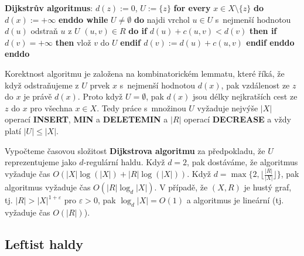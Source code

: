 \documentclass[a4paper,12pt]{article}
\newcommand{\algoritmus}[1]{
  {
  \setlength\fboxrule{0.5pt}

  \begin{boxedminipage}{0.8\textwidth}

 #1
  \end{boxedminipage}

  }
  }
\begin{document}
\algoritmus{{\bf Dijkstrův algoritmus}:\newline 
$d(z):=0$, $U:=\{z\}$\newline 
{\bf \textsf{for every}} $x\in X\setminus \{z\}$ {\bf \textsf{do}} $d(x):=+\infty$ {\bf \textsf{enddo}\newline 
\textsf{while}} $U\ne\emptyset$ {\bf \textsf{do}\newline 
\phantom{{\rm ---}}}najdi vrchol $u\in U$ s~nejmenší hodnotou $
d(u)$\newline 
\phantom{---}odstraň $u$ z $U$\newline 
\phantom{---}{\bf \textsf{for every}} $(u,v)\in R$ {\bf \textsf{do} \newline 
\phantom{{\rm ------}}\textsf{if}} $d(u)+c(u,v)<d(v)$ {\bf \textsf{then}\newline 
\phantom{{\rm ---------}}\textsf{if}} $d(v)=+\infty$ {\bf \textsf{then}} vlož $v$ \textsf{do} $
U$ {\bf \textsf{endif}\newline 
\phantom{{\rm ---------}}$d(v):=d(u)+c(u,v)$\newline 
\phantom{{\rm ------}}\textsf{endif}\newline 
\phantom{{\rm ---}}\textsf{enddo}\newline 
\textsf{enddo}
}
}

Korektnost algoritmu je založena na kombinatorickém 
lemmatu, které říká, že když odstra\-ňuje\-me z $
U$ prvek $x$ s~nejmenší hodnotou $d(x)$, pak vzdálenost ze $z$ do $x$ je právě 
$d(x)$. Proto když $U=\emptyset$, pak $d(x)$ jsou délky nejkratších cest ze 
$z$ do $x$ pro všechna $x\in X$. Tedy práce s~množinou $U$ vyžaduje 
nejvýše $|X|$ operací {\bf INSERT}, {\bf MIN} a {\bf DELETEMIN} a $
|R|$ operací 
{\bf DECREASE} a vždy platí $|U|\le |X|$. 

Vypočteme časovou složitost 
{\bf Dijkstrova algoritmu} za předpokladu, že $U$ reprezentujeme jako $
d$-regulární 
haldu. Když $d=2$, pak dostáváme, že algoritmus vyžaduje čas 
$O(|X|\log(|X|)+|R|\log(|X|))$. Když $d=\max\{2,\lfloor\frac {
|R|}{|X|}\rfloor \}$, pak algoritmus 
vyžaduje čas $O(|R|\log_d|X|)$. V případě, že $
(X,R)$ je hustý graf, 
tj. $|R|>|X|^{1+\varepsilon}$ pro $\varepsilon >0$, pak $\log_d|X
|=O(1)$ a algoritmus 
je lineární (tj. vyžaduje čas $O(|R|)$).

 
\subsection{Leftist haldy}
\end{document}
